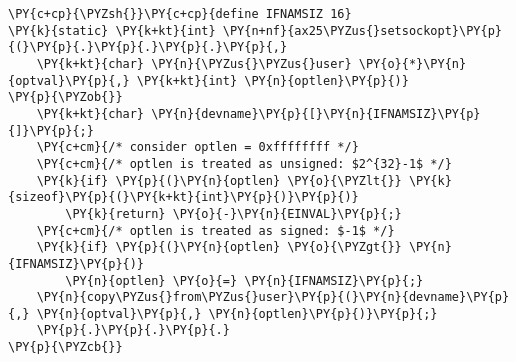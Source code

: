 \begin{Verbatim}[commandchars=\\\{\},codes={\catcode`\$=3\catcode`\^=7\catcode`\_=8}]
\PY{c+cp}{\PYZsh{}}\PY{c+cp}{define IFNAMSIZ 16}
\PY{k}{static} \PY{k+kt}{int} \PY{n+nf}{ax25\PYZus{}setsockopt}\PY{p}{(}\PY{p}{.}\PY{p}{.}\PY{p}{.}\PY{p}{,}
    \PY{k+kt}{char} \PY{n}{\PYZus{}\PYZus{}user} \PY{o}{*}\PY{n}{optval}\PY{p}{,} \PY{k+kt}{int} \PY{n}{optlen}\PY{p}{)}
\PY{p}{\PYZob{}}
    \PY{k+kt}{char} \PY{n}{devname}\PY{p}{[}\PY{n}{IFNAMSIZ}\PY{p}{]}\PY{p}{;}
    \PY{c+cm}{/* consider optlen = 0xffffffff */}
    \PY{c+cm}{/* optlen is treated as unsigned: $2^{32}-1$ */}
    \PY{k}{if} \PY{p}{(}\PY{n}{optlen} \PY{o}{\PYZlt{}} \PY{k}{sizeof}\PY{p}{(}\PY{k+kt}{int}\PY{p}{)}\PY{p}{)}
        \PY{k}{return} \PY{o}{-}\PY{n}{EINVAL}\PY{p}{;}
    \PY{c+cm}{/* optlen is treated as signed: $-1$ */}
    \PY{k}{if} \PY{p}{(}\PY{n}{optlen} \PY{o}{\PYZgt{}} \PY{n}{IFNAMSIZ}\PY{p}{)}
        \PY{n}{optlen} \PY{o}{=} \PY{n}{IFNAMSIZ}\PY{p}{;}
    \PY{n}{copy\PYZus{}from\PYZus{}user}\PY{p}{(}\PY{n}{devname}\PY{p}{,} \PY{n}{optval}\PY{p}{,} \PY{n}{optlen}\PY{p}{)}\PY{p}{;}
    \PY{p}{.}\PY{p}{.}\PY{p}{.}
\PY{p}{\PYZcb{}}
\end{Verbatim}
